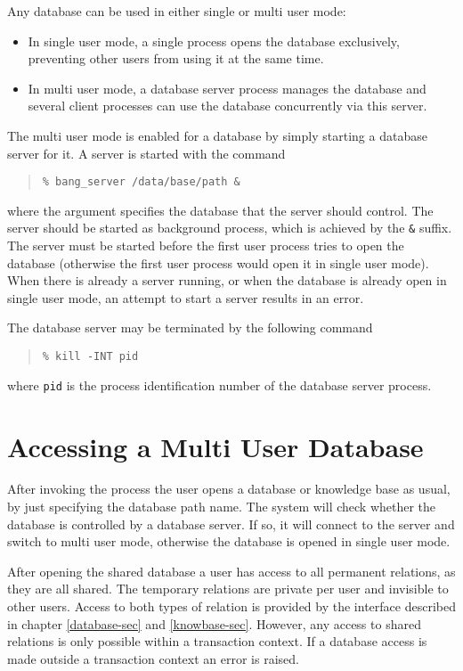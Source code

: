 Any database can be used in either single or multi user mode:
\begin{itemize}
\item In single user mode, a single \eclipse process opens the database
exclusively, preventing other users from using it at the same time.
\item In multi user mode, a database server process manages the
database and several \eclipse client processes can use the database
concurrently via this server.
\end{itemize}
The multi user mode is enabled for a database by simply starting
a database server for it.  A server is started with the command 
\begin{quote}\begin{verbatim}
% bang_server /data/base/path &
\end{verbatim}\end{quote}
where the argument specifies the database that the server should control.
The server should be started as background process, which is achieved 
by the \verb+&+ suffix. 
The server must be started before the first user process tries to
open the database (otherwise the first user process would open it
in single user mode).
When there is already a server running, or when the database is
already open in single user mode, an attempt to start a server
results in an error.

The database server may be terminated by the following command
\begin{quote}\begin{verbatim}
% kill -INT pid
\end{verbatim}\end{quote}
where {\tt pid} is the process identification 
number of the database server process.

\section{Accessing a Multi User Database}

After invoking the \eclipse process the user opens a database or
knowledge base as usual, by just specifying the database path name.
The system will check whether the database is controlled
by a database server. If so, it will connect to the server and
switch to multi user mode, otherwise the database is opened in single
user mode.
 
After opening the shared database a user has access to all permanent 
relations, as they are all shared. The temporary relations are private 
per user and invisible to other users. Access to both types of relation 
is provided by the interface described in chapter \ref{database-sec} and
\ref{knowbase-sec}. However, any access to shared relations is only
possible within a transaction context.
If a database access is made outside a transaction context 
an error is raised.

